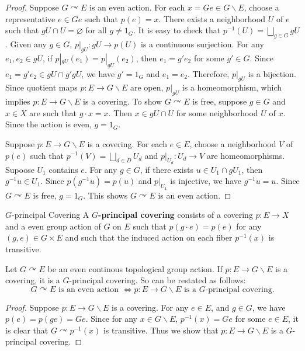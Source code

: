 \documentclass{report}
\def\acts{\curvearrowright}
\begin{document}
\begin{proof}
	Suppose $G \acts E$ is an even action. For each $x=Ge \in G \backslash E$, choose a representative $e \in Ge$ such that $p(e)=x$. There exists a neighborhood $U$ of $e$ such that $gU \cap U = \varnothing$ for all $g \neq 1_G$. It is easy to check that $p^{-1}(U)=\bigsqcup_{g\in G} gU$. Given any $g\in G$, $p|_{gU}: gU \to p(U)$ is a continuous surjection. For any $e_1,e_2\in gU$, if $p|_{gU}(e_1)=p|_{gU}(e_2)$, then $e_1=g'e_2$ for some $g'\in G$. Since $e_1=g'e_2\in gU \cap g'gU$, we have $g'=1_G$ and $e_1=e_2$. Therefore, $p|_{gU}$ is a bijection. Since quotient maps $p: E\to G\backslash E$ are open, $p|_{gU}$ is a homeomorphism, which implies $p: E\to G\backslash E$ is a covering. To show $G \acts E$ is free, suppose $g \in G$ and $x \in X$ are such that $g \cdot x=x$. Then $x \in g U \cap U$ for some neighborhood $U$ of $x$. Since the action is even, $g=1_G$.

	Suppose $p: E\to G\backslash E$ is a covering. For each $e\in E$, choose a neighborhood $V$ of $p(e)$ such that $p^{-1}\left(V\right)=\bigsqcup_{d\in D} U_d$ and $p|_{U_d}: U_d\to V$ are homeomorphisms. Supoose $U_1$ contains $e$. For any $g\in G$, if there exists $u \in U_1 \cap gU_1$, then $g^{-1}u \in U_1$. Since $p(g^{-1}u)=p(u)$ and $p|_{U_1}$ is injective, we have $g^{-1}u=u$. Since $G \acts E$ is free, $g=1_G$. This shows $G \acts E$ is an even action.
\end{proof}


\begin{definition}{$G$-principal Covering}{}
	A \textbf{$G$-principal covering} consists of a covering $p: E \rightarrow X$ and a even group action of $G$ on $E$ such that $p(g \cdot e)=p(e)$ for any $(g, e) \in G \times E$ and such that the induced action on each fiber $p^{-1}(x)$ is transitive.
\end{definition}
\begin{proposition}{}{}
	Let $G\acts E$ be an even continous topological group action. If $p: E\to G\backslash E$ is a covering, it is a $G$-principal covering. So  can be restated as follows:
	\[ 
	G \acts E\text{ is an even action }\iff p: E\to G\backslash E \text{ is a $G$-principal covering}.
	\]
\end{proposition}
\begin{proof}
	Suppose $p: E\to G\backslash E$ is a covering. For any $e\in E$, and $g\in G$, we have $p(e)=p(ge)=Ge$. Since for any $x\in G \backslash E$, $p^{-1}(x)=Ge$ for some $e\in E$, it is clear that $G \acts p^{-1}(x)$ is transitive. Thus we show that $p: E\to G\backslash E$ is a $G$-principal covering.
\end{proof}
\end{document}

